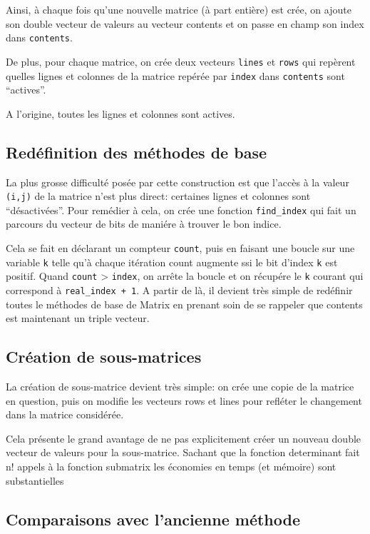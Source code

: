\documentclass[a4paper,11pt]{article}
\begin{document}
Ainsi, à chaque fois qu'une nouvelle matrice (à part entière) est crée, on ajoute son double vecteur de valeurs au vecteur contents et on passe en champ son index dans \texttt{contents}.

De plus, pour chaque matrice, on crée deux vecteurs \texttt{lines} et \texttt{rows} qui repèrent quelles lignes et colonnes de la matrice repérée par \texttt{index} dans \texttt{contents} sont ``actives''.

A l'origine, toutes les lignes et colonnes sont actives.

\subsection{Redéfinition des méthodes de base}

La plus grosse difficulté posée par cette construction est que l'accès à la valeur \texttt{(i,j)} de la matrice n'est plus direct: certaines lignes et colonnes sont ``désactivées''. 
Pour remédier à cela, on crée une fonction \texttt{find\_index} qui fait un parcours du vecteur de bits de maniére à trouver le bon indice.

Cela se fait en déclarant un compteur \texttt{count}, puis en faisant une boucle sur une variable \texttt{k} telle qu'à chaque itération count augmente ssi le bit d'index \texttt{k} est positif. Quand \texttt{count} > \texttt{index}, on arrête la boucle
et on récupére le \texttt{k} courant qui correspond à \texttt{real\_index + 1}. 
A partir de là, il devient très simple de redéfinir toutes le méthodes de base de Matrix en prenant soin de se rappeler que contents est maintenant un triple vecteur.

\subsection{Création de sous-matrices}

La création de sous-matrice devient très simple: on crée une copie de la matrice en question, puis on modifie les vecteurs rows et lines pour refléter le changement dans la matrice considérée.

Cela présente le grand avantage de ne pas explicitement créer un nouveau double vecteur de valeurs pour la sous-matrice. Sachant que la fonction determinant fait n! appels à la fonction submatrix les économies en temps (et mémoire) sont substantielles


\subsection{Comparaisons avec l'ancienne méthode}
\end{document}
